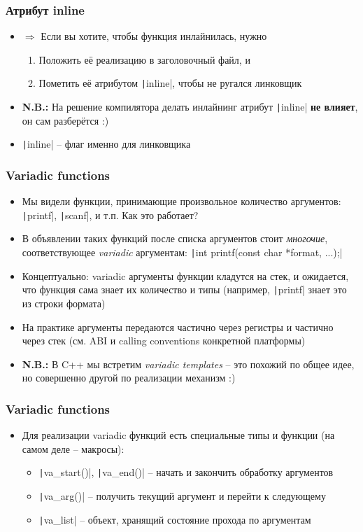 \documentclass[10pt]{beamer}
\begin{document}
\begin{frame}[fragile]
\frametitle{Атрибут inline}
\begin{itemize}
\item \(\Longrightarrow\) Если вы хотите, чтобы функция инлайнилась, нужно
\begin{enumerate}
\item Положить её реализацию в заголовочный файл, и
\item Пометить её атрибутом \texttt|inline|, чтобы не ругался линковщик
\end{enumerate}
\pause
\item \textbf{N.B.:} На решение компилятора делать инлайнинг атрибут \texttt|inline| \textbf{не влияет}, он сам разберётся :)
\pause
\item \texttt|inline| -- флаг именно для линковщика
\end{itemize}
\end{frame}

\begin{frame}[fragile]
\frametitle{Variadic functions}
\begin{itemize}
\item Мы видели функции, принимающие произвольное количество аргументов: \texttt|printf|, \texttt|scanf|, и т.п. Как это работает?
\pause
\item В объявлении таких функций после списка аргументов стоит \textit{многочие}, соответствующее \textit{variadic} аргументам: \texttt|int printf(const char *format, ...);|
\pause
\item Концептуально: variadic аргументы функции кладутся на стек, и ожидается, что функция сама знает их количество и типы (например, \texttt|printf| знает это из строки формата)
\pause
\item На практике аргументы передаются частично через регистры и частично через стек (см. ABI и calling conventions конкретной платформы)
\pause
\item \textbf{N.B.:} В C++ мы встретим \textit{variadic templates} -- это похожий по общее идее, но совершенно другой по реализации механизм :)
\end{itemize}
\end{frame}

\begin{frame}[fragile]
\frametitle{Variadic functions}
\begin{itemize}
\item Для реализации variadic функций есть специальные типы и функции (на самом деле -- макросы):
\pause
\begin{itemize}
\item \texttt|va_start()|, \texttt|va_end()| -- начать и закончить обработку аргументов
\pause
\item \texttt|va_arg()| -- получить текущий аргумент и перейти к следующему
\pause
\item \texttt|va_list| -- объект, хранящий состояние прохода по аргументам
\end{itemize}
\end{itemize}
\end{frame}
\end{document}
